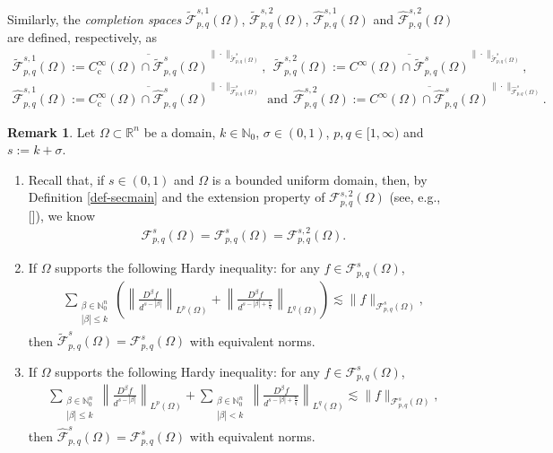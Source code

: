 \documentclass[11pt,twoside]{article}
\def\rn{{\mathbb{R}^n}}
\def\nn{{\mathbb N}}
\def\nno{\nn_0}
\def\cf{{\mathcal F}}
\def\hf{{\mathscr F }}
\def\fz{\infty }
\def\bz{\beta}
\def\boz{{\Omega}}
\def\sz{\sigma}
\theoremstyle{mylem}
\theoremstyle{definition}
\newtheorem{remark}[theorem]{Remark}
\numberwithin{equation}{section}
\begin{document}
Similarly, the {\it completion spaces} $\widetilde{\hf}_{p,q}^{s,1}(\boz)$, $\widetilde{\hf}_{p,q}^{s,2}(\boz)$,
$\widehat{\hf}_{p,q}^{s,1}(\boz)$ and
$\widehat{\hf}_{p,q}^{s,2}(\boz)$
are 
defined, respectively, as 
\begin{align*}
\widetilde{\hf}_{p,q}^{s,1}(\boz):=\overline{C_{\mathrm{c}}^{\fz}(\boz)\cap {\widetilde{\hf}}_{p, q}^{s}(\boz)}^{\|\cdot\|_{{\widetilde{\hf}}_{p,q}^s(\boz)}}, \ \ \widetilde{\hf}_{p,q}^{s,2}(\boz):=\overline{C^\infty(\boz)\cap {\widetilde{\hf}}_{p, q}^{s}(\boz)}^{\|\cdot\|_{{\widetilde{\hf}}_{p,q}^s(\boz)}},
\end{align*}
\begin{align*}
\widehat{\hf}_{p,q}^{s,1}(\boz):=\overline{C_{\mathrm{c}}^{\fz}(\boz)\cap {\widehat{\hf}}_{p, q}^{s}(\boz)}^{\|\cdot\|_{{\widehat{\hf}}_{p,q}^s(\boz)}}
\ \ \text{and}\ \ 
\widehat{\hf}_{p,q}^{s,2}(\boz):=\overline{C^\infty(\boz)\cap {\widehat{\hf}}_{p, q}^{s}(\boz)}^{\|\cdot\|_{{\widehat{\hf}}_{p,q}^s(\boz)}}.
\end{align*}

\begin{remark}
Let \( \boz \subset \rn\) be a domain, \( k \in \nn_0 \), \(\sz\in(0,1) \), \( p, q\in[1, \infty) \)  and	$s := k + \sz$.
\begin{enumerate}
\item[\rm(i)] 
Recall that, if $s\in (0,1)$ and $\Omega$
is a bounded uniform domain, then, by Definition \ref{def-secmain} and  the  extension property of  ${\cf}_{p,q}^{s,2}(\boz)$ (see, e.g., [\cite{ps2017}]), we know 
\begin{align*}
\hf_{p,q}^{s}(\boz)=\mathcal{F}_{p,q}^{s}(\boz)={\hf}_{p,q}^{s,2}(\boz).
\end{align*}

\item[\rm(ii)] 
If $\Omega$ supports the following Hardy
inequality: for any $f\in\hf_{p,q}^{s}(\boz)$,
\begin{align*}
\sum_{\substack{\bz\in\nno^n \\ |\bz| \leq k}}
\left(\left\|\frac{D^\beta f}{d^{s-|\beta|}}\right\|_{L^p(\Omega)}+\left\|\frac{D^\beta f}{d^{s-|\beta|+\frac{n}{q}}}\right\|_{L^q(\Omega)}\right)
\lesssim\|f\|_{\hf_{p,q}^{s}(\boz)},
\end{align*}
then $\widetilde{\mathscr{F}}_{p,q}^{s}(\boz)
=\hf_{p,q}^{s}(\boz)$
with equivalent norms.

\item[\rm(iii)]
If $\Omega$ supports the following Hardy
inequality: for any $f\in\hf_{p,q}^{s}(\boz)$,
\begin{align*}
\sum_{\substack{\bz\in\nno^n \\ |\bz| \leq k}}
\left\|\frac{D^\beta f}{d^{s-|\beta|}}\right\|_{L^p(\Omega)}+\sum_{\substack{\bz\in\nno^n \\|\bz| < k}} \left\|\frac{D^\beta f}{d^{s-|\beta|+\frac{n}{q}}}\right\|_{L^q(\Omega)}
\lesssim\|f\|_{\hf_{p,q}^{s}(\boz)},
\end{align*}
then $\widehat{\mathscr{F}}_{p,q}^{s}(\boz)
=\hf_{p,q}^{s}(\boz)$ with equivalent norms.
\end{enumerate}
\end{remark}
\end{document}
